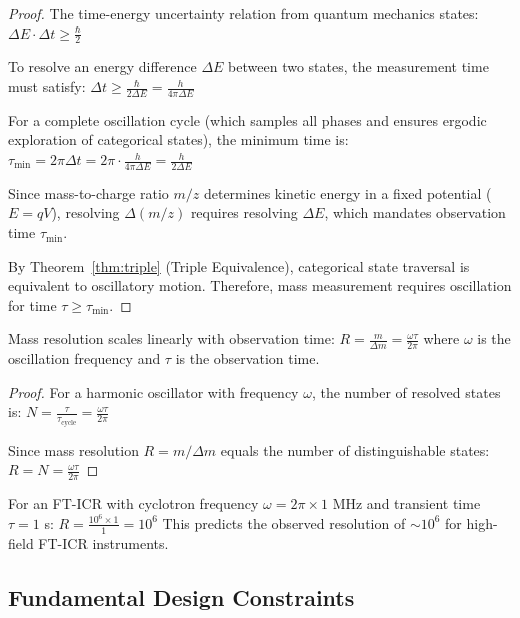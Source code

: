 \begin{proof}
The time-energy uncertainty relation from quantum mechanics states:
$
\Delta E \cdot \Delta t \geq \frac{\hbar}{2}
$

To resolve an energy difference $\Delta E$ between two states, the measurement time must satisfy:
$
\Delta t \geq \frac{\hbar}{2\Delta E} = \frac{h}{4\pi \Delta E}
$

For a complete oscillation cycle (which samples all phases and ensures ergodic exploration of categorical states), the minimum time is:
$
\tau_{\min} = 2\pi \Delta t = 2\pi \cdot \frac{h}{4\pi \Delta E} = \frac{h}{2\Delta E}
$

Since mass-to-charge ratio $m/z$ determines kinetic energy in a fixed potential ($E = qV$), resolving $\Delta(m/z)$ requires resolving $\Delta E$, which mandates observation time $\tau_{\min}$.

By Theorem~\ref{thm:triple} (Triple Equivalence), categorical state traversal is equivalent to oscillatory motion. Therefore, mass measurement requires oscillation for time $\tau \geq \tau_{\min}$.
\end{proof}

\begin{corollary}
\label{cor:resolution_time}
Mass resolution scales linearly with observation time:
$
R = \frac{m}{\Delta m} = \frac{\omega \tau}{2\pi}
$
where $\omega$ is the oscillation frequency and $\tau$ is the observation time.
\end{corollary}

\begin{proof}
For a harmonic oscillator with frequency $\omega$, the number of resolved states is:
$
N = \frac{\tau}{\tau_{\mathrm{cycle}}} = \frac{\omega \tau}{2\pi}
$

Since mass resolution $R = m/\Delta m$ equals the number of distinguishable states:
$
R = N = \frac{\omega \tau}{2\pi}
$
\end{proof}

\begin{example}
\label{ex:fticr_resolution}
For an FT-ICR with cyclotron frequency $\omega = 2\pi \times 1$ MHz and transient time $\tau = 1$ s:
$
R = \frac{10^6 \times 1}{1} = 10^6
$
This predicts the observed resolution of $\sim 10^6$ for high-field FT-ICR instruments.
\end{example}

\subsection{Fundamental Design Constraints}

